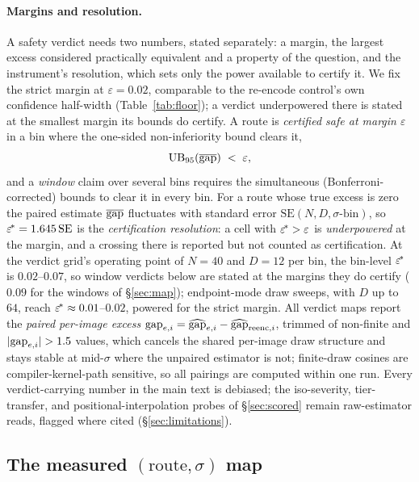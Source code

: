 \paragraph{Margins and resolution.}
A safety verdict needs two numbers, stated separately: a margin, the
largest excess considered practically equivalent and a property of
the question, and the instrument's resolution, which sets only the
power available to certify it. We fix the strict margin at
$\varepsilon = 0.02$, comparable to the re-encode control's own
confidence half-width (Table~\ref{tab:floor}); a verdict underpowered
there is stated at the smallest margin its bounds do certify. A route
is
\emph{certified safe at margin $\varepsilon$} in a bin where
the one-sided non-inferiority bound clears it,
\begin{equation}
\text{UB}_{95}\!\left(\overline{\mathrm{gap}}\right) \;<\; \varepsilon,
\label{eq:safe}
\end{equation}
and a \emph{window} claim over several bins requires the simultaneous
(Bonferroni-corrected) bounds to clear it in every bin. For a route
whose true excess is zero the paired estimate $\overline{\mathrm{gap}}$ fluctuates with
standard error $\mathrm{SE}(N, D, \sigma\text{-bin})$, so
$\varepsilon^{\!*} = 1.645\,\mathrm{SE}$ is the \emph{certification
resolution}: a cell with $\varepsilon^{\!*} > \varepsilon$ is
\emph{underpowered} at the margin, and a crossing there is reported
but not counted as certification. At the verdict grid's operating point of $N{=}40$ and
$D{=}12$ per bin, the bin-level $\varepsilon^{\!*}$ is $0.02$--$0.07$, so
window verdicts below are stated at the margins they do certify
($0.09$ for the windows of \S\ref{sec:map});
endpoint-mode draw sweeps, with $D$ up to $64$, reach
$\varepsilon^{\!*} \approx 0.01$--$0.02$, powered for the strict margin. All
verdict maps report the \emph{paired per-image excess}
$\mathrm{gap}_{e,i} = \widehat{\mathrm{gap}}_{e,i} - \widehat{\mathrm{gap}}_{\mathrm{reenc},i}$, trimmed of non-finite
and $|\mathrm{gap}_{e,i}| > 1.5$ values, which cancels the shared per-image
draw structure and stays stable at mid-$\sigma$ where the unpaired
estimator is not; finite-draw cosines are compiler-kernel-path
sensitive, so all pairings are computed within one run. Every
verdict-carrying number in the main text is debiased; the
iso-severity, tier-transfer, and positional-interpolation probes of
\S\ref{sec:scored} remain raw-estimator reads, flagged where cited
(\S\ref{sec:limitations}).

\subsection{The measured $(\text{route}, \sigma)$ map}
\label{sec:verdict}
\label{sec:map}

